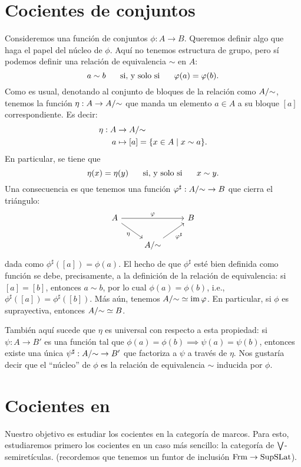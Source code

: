 \section{Cocientes de conjuntos}
Consideremos una función de conjuntos $\phi:A\to B$.
Queremos definir algo que haga el papel del núcleo de $\phi$.
Aquí no tenemos estructura de grupo, pero sí podemos definir una relación
de equivalencia $\sim$ en $A$:
\[
    a\sim b \hspace{5mm}\text{ si, y solo si }\hspace{5mm} \varphi(a) = \varphi(b)
.\]
Como es usual, denotando al conjunto de bloques de la relación como
$A/{\sim}$, tenemos la función $\eta: A\to A/{\sim}$ que manda un elemento
$a\in A$ a su bloque $[a]$ correspondiente.
Es decir:
\begin{align*}
    \eta:A&\to A/{\sim} \\
    a&\mapsto [a] = \{x\in A \mid x\sim a\}.
\end{align*}
En particular, se tiene que
\[
    \eta(x) = \eta(y) \hspace{5mm}\text{ si, y solo si }\hspace{5mm} x\sim y
.\]
Una consecuencia es que tenemos una función
$\varphi^\sharp:A/{\sim} \to B$ que cierra el triángulo:
\[
\begin{tikzcd}
    A\ar[rr,"\phi"] \ar[dr,"\eta"'] && B \\
    & A/\simr \ar[ur,"\phi^\sharp"']
\end{tikzcd}
\]
dada como $\phi^\sharp([a]) = \phi(a)$.
El hecho de que $\phi^\sharp$ esté bien definida como función se debe,
precisamente, a la definición de la relación de equivalencia:
si $[a]=[b]$, entonces $a\sim b$, por lo cual $\phi(a)=\phi(b)$, i.e.,
$\phi^\sharp([a])=\phi^\sharp([b])$.
Más aún, tenemos $A/{\sim}\simeq \operatorname{im} \varphi$.
En particular, si $\phi$ es suprayectiva, entonces $A/{\sim} \simeq B$.

También aquí sucede que $\eta$ es universal con respecto a esta
propiedad: si $\psi:A\to B'$ es una función tal que
$\phi(a)=\phi(b)\implies \psi(a)=\psi(b)$,
entonces existe una única $\psi^\sharp:A/{\sim}\to B'$
que factoriza a $\psi$ a través de $\eta$.
Nos gustaría decir que el ``núcleo'' de $\phi$ es la relación de
equivalencia $\sim$ inducida por $\phi$.

\section{Cocientes en }
Nuestro objetivo es estudiar los cocientes en la categoría de
marcos.
Para esto, estudiaremos primero los cocientes en un caso más
sencillo: la categoría de $\bigvee$-semiretículas.
(recordemos que tenemos un funtor de inclusión $\mathrm{Frm}\to\mathrm{SupSLat}$).

